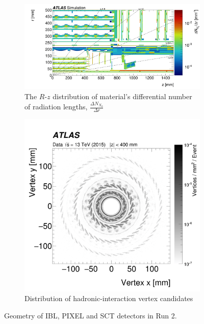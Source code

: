 \begin{figure}[htbp!]
\centering
\captionsetup{justification=centering}
    \begin{subfigure}[b]{0.6\textwidth}
        \includegraphics[width=\textwidth]{figures/detector/ID_rzmap}
        \caption{The $R$-$z$ distribution of material's differential number of radiation lengths, $\frac{\Delta N_{X_0}}{\Delta r}$}
        \label{fig:Det_ID_rz}
    \end{subfigure}
    \quad
    \begin{subfigure}[b]{0.3\textwidth}
        \includegraphics[width=\textwidth]{figures/detector/ID_data_map_XY}
        \caption{Distribution of hadronic-interaction vertex candidates}
        \label{fig:Det_ID_xy}
    \end{subfigure}
\caption{Geometry of IBL, PIXEL and SCT detectors in Run 2.}
\label{fig:Det_ID}
\end{figure}

